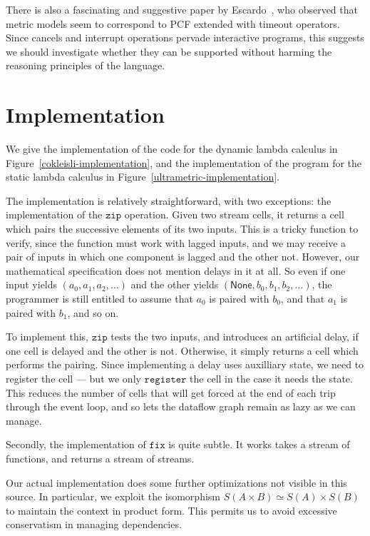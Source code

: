 \documentclass[preprint]{sigplanconf}
\newcommand{\term}[1]{\ensuremath{\mathtt{{#1}}}}
\newcommand{\None}{\mathsf{None}}
\begin{document}
There is also a fascinating and suggestive paper by
Escardo~\cite{escardo-metric}, who observed that metric models seem to
correspond to PCF extended with timeout operators. Since cancels and
interrupt operations pervade interactive programs, this suggests we
should investigate whether they can be supported without harming the
reasoning principles of the language.

\appendix

\section{Implementation}

We give the implementation of the code for the dynamic lambda calculus
in Figure~\ref{cokleisli-implementation}, and the implementation of the
program for the static lambda calculus in Figure~\ref{ultrametric-implementation}. 

The implementation is relatively straightforward, with two exceptions:
the implementation of the \term{zip} operation. Given two stream
cells, it returns a cell which pairs the successive elements of its
two inputs. This is a tricky function to verify, since the function
must work with lagged inputs, and we may receive a pair of inputs in
which one component is lagged and the other not. However, our
mathematical specification does not mention delays in it at all. So
even if one input yields $(a_0, a_1, a_2, \ldots)$ and the other
yields $(\None, b_0, b_1, b_2, \ldots)$, the programmer is still
entitled to assume that $a_0$ is paired with $b_0$, and that $a_1$ is
paired with $b_1$, and so on.

To implement this, \term{zip} tests the two inputs, and introduces an
artificial delay, if one cell is delayed and the other is not.
Otherwise, it simply returns a cell which performs the pairing. Since
implementing a delay uses auxilliary state, we need to register the
cell --- but we only \term{register} the cell in the case it needs the
state. This reduces the number of cells that will get forced at the
end of each trip through the event loop, and so lets the dataflow
graph remain as lazy as we can manage. 

Secondly, the implementation of \term{fix} is quite subtle. It works
takes a stream of functions, and returns a stream of streams.

Our actual implementation does some further optimizations not visible
in this source. In particular, we exploit the isomorphism $S(A \times
B) \simeq S(A) \times S(B)$ to maintain the context in product form.
This permits us to avoid excessive conservatism in managing dependencies.
\end{document}

